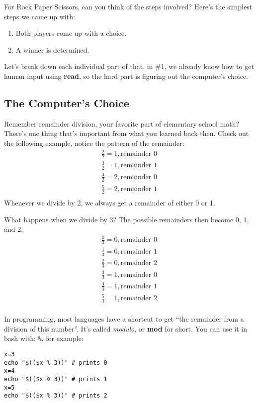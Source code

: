 \documentclass{article}
\begin{document}
For Rock Paper Scissors, can you think of the steps involved? Here's the
simplest steps we came up with:
\begin{enumerate}
    \item Both players come up with a choice.
    \item A winner is determined.
\end{enumerate}

Let's break down each individual part of that. in \#1, we already know how to
get human input using \textbf{read}, so the hard part is figuring out the
computer's choice.

\subsection*{The Computer's Choice}
Remember remainder division, your favorite part of elementary school math? There's one
thing that's important from what you learned back then. Check out the following
example, notice the pattern of the remainder:
\begin{align*}
    \frac{2}{2} = 1, \text{remainder } 0\\
    \frac{3}{2} = 1, \text{remainder } 1\\
    \frac{4}{2} = 2, \text{remainder } 0\\
    \frac{5}{2} = 2, \text{remainder } 1\\
\end{align*}
Whenever we divide by 2, we always get a remainder of either 0 or 1.

What happens when we divide by 3? The possible remainders then become 0, 1, and 2.
\begin{align*}
    \frac{0}{3} = 0, \text{remainder } 0\\
    \frac{1}{3} = 0, \text{remainder } 1\\
    \frac{2}{3} = 0, \text{remainder } 2\\
    \frac{3}{3} = 1, \text{remainder } 0\\
    \frac{4}{3} = 1, \text{remainder } 1\\
    \frac{5}{3} = 1, \text{remainder } 2\\
\end{align*}

In programming, most languages have a shortcut to get ``the remainder from a
division of this number''. It's called \textit{modulo}, or \textbf{mod} for
short. You can use it in bash with: \lstinline|%|, for example:
\begin{lstlisting}
x=3
echo "$(($x % 3))" # prints 0
x=4
echo "$(($x % 3))" # prints 1
x=5
echo "$(($x % 3))" # prints 2
\end{lstlisting}
\end{document}
